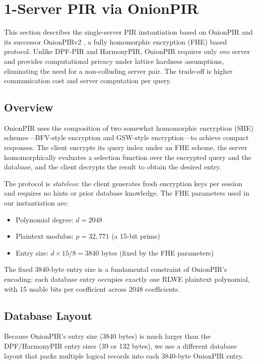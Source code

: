 \section{1-Server PIR via OnionPIR}
\label{sec:onionpir}

This section describes the single-server PIR instantiation based on OnionPIR \cite{onionpir21} and its successor OnionPIRv2 \cite{onionpirv2}, a fully homomorphic encryption (FHE) based protocol. Unlike DPF-PIR and HarmonyPIR, OnionPIR requires only \emph{one} server and provides computational privacy under lattice hardness assumptions, eliminating the need for a non-colluding server pair. The trade-off is higher communication cost and server computation per query.

\subsection{Overview}

OnionPIR uses the composition of two somewhat homomorphic encryption (SHE) schemes---BFV-style encryption and GSW-style encryption---to achieve compact responses. The client encrypts its query index under an FHE scheme, the server homomorphically evaluates a selection function over the encrypted query and the database, and the client decrypts the result to obtain the desired entry.

The protocol is \emph{stateless}: the client generates fresh encryption keys per session and requires no hints or prior database knowledge. The FHE parameters used in our instantiation are:
\begin{itemize}[nolistsep,leftmargin=*]
    \item Polynomial degree: $d = 2048$
    \item Plaintext modulus: $p = 32{,}771$ (a 15-bit prime)
    \item Entry size: $d \times 15 / 8 = 3840$ bytes (fixed by the FHE parameters)
\end{itemize}

The fixed 3840-byte entry size is a fundamental constraint of OnionPIR's encoding: each database entry occupies exactly one RLWE plaintext polynomial, with 15 usable bits per coefficient across 2048 coefficients.

\subsection{Database Layout}
\label{sec:onion-layout}

Because OnionPIR's entry size (3840 bytes) is much larger than the DPF/HarmonyPIR entry sizes (39 or 132 bytes), we use a different database layout that packs multiple logical records into each 3840-byte OnionPIR entry.

